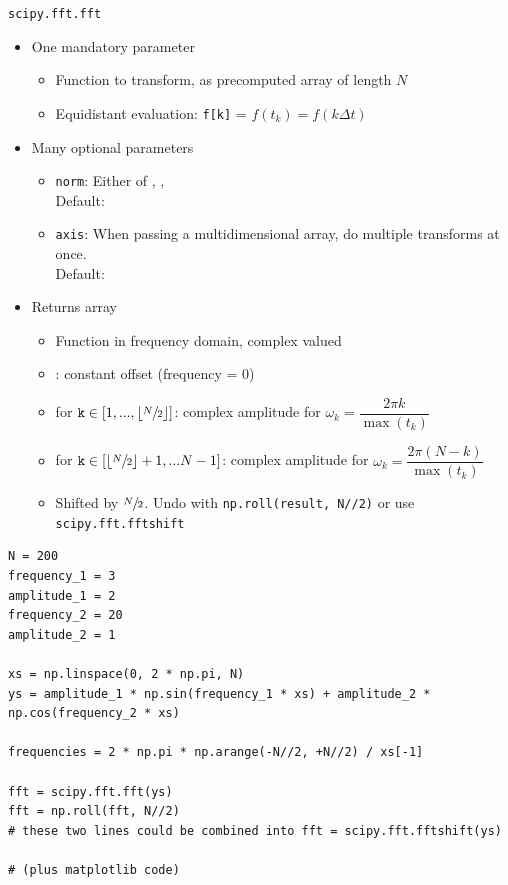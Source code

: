 \begin{frame}{\texttt{scipy.fft.fft}}
%
\begin{itemize}
\item One mandatory parameter
	\begin{itemize}
	\item Function to transform, as precomputed array of length $N$
	\item Equidistant evaluation: \texttt{f[k]} = $f(t_k) = f(k \Delta t)$
	\end{itemize}
\item Many optional parameters
	\begin{itemize}
	\item \texttt{norm}: Either of , , \\
		Default: 
	\item \texttt{axis}: When passing a multidimensional array, do multiple transforms at once.\\
		Default: 
	\end{itemize}
\item Returns array
	\begin{itemize}
	\item Function in frequency domain, complex valued
	\item {}: constant offset (frequency = 0)
	\item {} for $\texttt{k} \in [1, ..., \lfloor \sfrac{N}{2} \rfloor]$: complex amplitude for $\omega_k = \dfrac{2\pi k}{\max(t_k)}$
	\item {} for $\texttt{k} \in [\lfloor \sfrac{N}{2} \rfloor + 1, ... N -1]$: complex amplitude for $\omega_k = \dfrac{2\pi (N-k)}{\max(t_k)}$
	\item[\Thus] Shifted by $\sfrac{N}{2}$. Undo with \texttt{np.roll(result, N//2)} or use \texttt{scipy.fft.fftshift}
	\end{itemize}
\end{itemize}
%
\end{frame}


\begin{frame}[fragile]
%
\begin{codebox}
\begin{verbatim}
N = 200
frequency_1 = 3
amplitude_1 = 2
frequency_2 = 20
amplitude_2 = 1

xs = np.linspace(0, 2 * np.pi, N)
ys = amplitude_1 * np.sin(frequency_1 * xs) + amplitude_2 * np.cos(frequency_2 * xs)

frequencies = 2 * np.pi * np.arange(-N//2, +N//2) / xs[-1]

fft = scipy.fft.fft(ys)
fft = np.roll(fft, N//2)
# these two lines could be combined into fft = scipy.fft.fftshift(ys)

# (plus matplotlib code)
\end{verbatim}
\end{codebox}
%
\end{frame}


